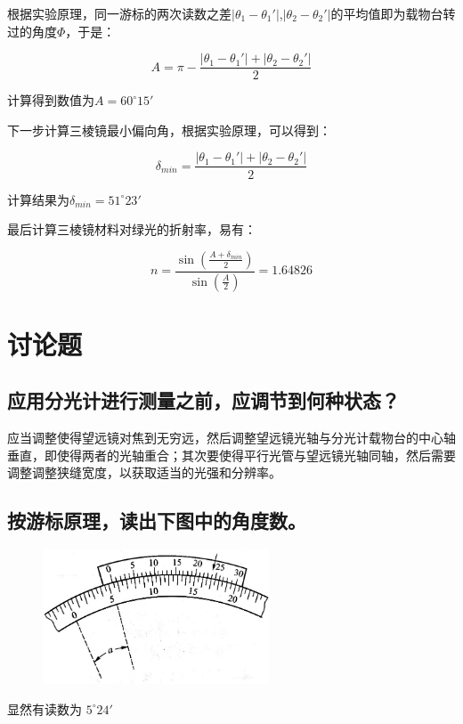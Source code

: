 \documentclass{ctexart}
\begin{document}
根据实验原理，同一游标的两次读数之差$ \left|\theta_1 - \theta_1'\right| $,$ \left|\theta_2 - \theta_2'\right| $的平均值即为载物台转过的角度$\varPhi $，于是：

$$ A = \pi - \frac{\left|\theta_1 - \theta_1'\right|+\left|\theta_2 - \theta_2'\right|}{2} $$

计算得到数值为$ A = 60^\circ 15' $

下一步计算三棱镜最小偏向角，根据实验原理，可以得到：

$$ \delta_{min} = \frac{\left|\theta_1 - \theta_1'\right|+\left|\theta_2 - \theta_2'\right|}{2} $$

计算结果为$ \delta_{min} = 51^\circ 23' $

最后计算三棱镜材料对绿光的折射率，易有：

$$ n = \frac{\sin\left(\frac{A+\delta_{min}}{2}\right)}{\sin\left(\frac{A}{2}\right)} = 1.64826 $$

\newpage

\section{讨论题}

\subsection{应用分光计进行测量之前，应调节到何种状态？}

应当调整使得望远镜对焦到无穷远，然后调整望远镜光轴与分光计载物台的中心轴垂直，即使得两者的光轴重合；其次要使得平行光管与望远镜光轴同轴，然后需要调整调整狭缝宽度，以获取适当的光强和分辨率。

\subsection{按游标原理，读出下图中的角度数。}

\begin{figure}[!ht]
    \centering
    \includegraphics[width=0.6\textwidth]{./1.jpg}
\end{figure}

显然有读数为 $ 5^\circ 24' $
\end{document}
